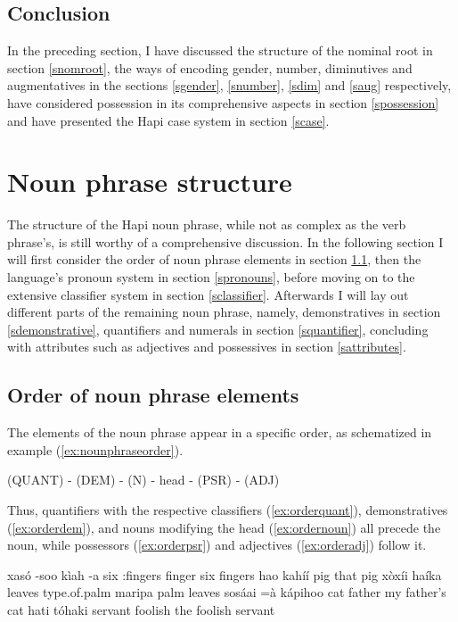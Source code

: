 \documentclass[a4paper, 12pt, oneside]{memoir}
\begin{document}
\subsection{Conclusion}
In the preceding section, I have discussed the structure of the nominal root in section \ref{snomroot}, the ways of encoding gender, number, diminutives and augmentatives in the sections \ref{sgender}, \ref{snumber}, \ref{sdim} and \ref{saug} respectively, have considered possession in its comprehensive aspects in section \ref{spossession} and have presented the Hapi case system in section \ref{scase}.
\section{Noun phrase structure}\label{snounphrase}
The structure of the Hapi noun phrase, while not as complex as the verb phrase's, is still worthy of a comprehensive discussion. In the following section I will first consider the order of noun phrase elements in section \ref{snounorder}, then the language's pronoun system in section \ref{spronouns}, before moving on to the extensive classifier system in section \ref{sclassifier}. Afterwards I will lay out different parts of the remaining noun phrase, namely, demonstratives in section \ref{sdemonstrative}, quantifiers and numerals in section \ref{squantifier}, concluding with attributes such as adjectives and possessives in section \ref{sattributes}. 
\subsection{Order of noun phrase elements}\label{snounorder}
The elements of the noun phrase appear in a specific order, as schematized in example (\ref{ex:nounphraseorder}).
\begin{examples}
\ex \label{ex:nounphraseorder}
(QUANT) - (DEM) - (N) - head -  (PSR) - (ADJ) 
\end{examples}
Thus, quantifiers with the respective classifiers (\ref{ex:orderquant}), demonstratives (\ref{ex:orderdem}), and nouns modifying the head (\ref{ex:ordernoun}) all precede the noun, while possessors (\ref{ex:orderpsr}) and adjectives (\ref{ex:orderadj}) follow it.
\begin{examples}
\ex \label{ex:orderquant}
\bits xasó -soo kìah -a
\gloss six {\Cl}:fingers finger {\Pl}
\tr six fingers
\ex \label{ex:orderdem}
\bits hao kahíí
\gloss {\Demdist} pig
\tr that pig
\ex \label{ex:ordernoun}
\bits xòxíi haíka
\gloss leaves type.of.palm
\tr maripa palm leaves
\ex \label{ex:orderpsr}
\bits sosáai =à kápihoo
\gloss cat {\Link} father
\tr my father's cat
\ex \label{ex:orderadj}
\bits hati tóhaki
\gloss servant foolish
\tr the foolish servant
\end{examples}
\end{document}
